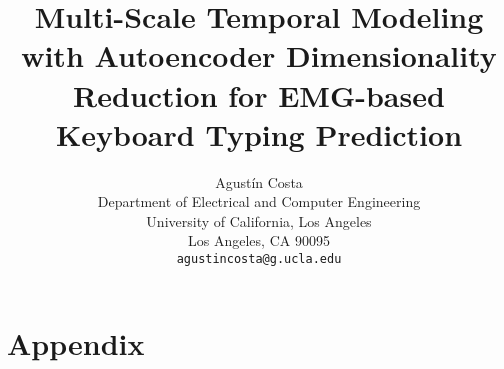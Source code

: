 \documentclass{article}
\title{Multi-Scale Temporal Modeling with Autoencoder Dimensionality Reduction for EMG-based Keyboard Typing Prediction}
\author{
  Agustín Costa\\
  Department of Electrical and Computer Engineering\\
  University of California, Los Angeles\\
  Los Angeles, CA 90095\\
  \texttt{agustincosta@g.ucla.edu}
}
\begin{document}
\maketitle












\newpage
\appendix
\section*{Appendix}


\newpage

\end{document}
